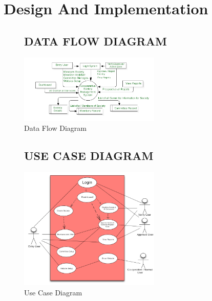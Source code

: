 \chapter{Design And Implementation}


\begin{figure}[h]
  \section{DATA FLOW DIAGRAM}
  \centering
  \includegraphics[width=0.6\textwidth]{Chap3/1.jpg}
  \caption{Data Flow Diagram}
\end{figure}


\begin{figure}[h]
  \section{USE CASE DIAGRAM}
  \centering
  \includegraphics[width=0.6\textwidth]{Chap3/2.jpg}
  \caption{Use Case Diagram}
  \label{fig:example}
\end{figure}

